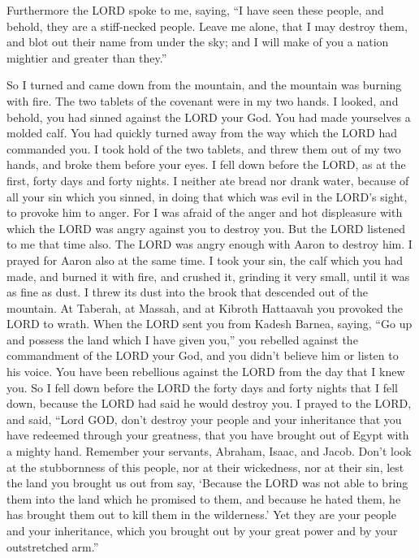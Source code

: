 \myverse{}Furthermore the LORD spoke to me, saying, “I have seen these
people, and behold, they are a stiff-necked people.
\myverse{}Leave me alone, that I may destroy them, and blot out their name from under
the sky; and I will make of you a nation mightier and greater than they.”


\myverse{}So I turned and came down from the mountain, and the mountain
was burning with fire. The two tablets of the covenant were in my two hands.
\myverse{}I looked, and behold, you had sinned against the LORD your God. You had made
yourselves a molded calf. You had quickly turned away from the way which the LORD had commanded you.
\myverse{}I took hold of the two tablets, and threw them out of my two hands, and broke
them before your eyes.
\myverse{}I fell down before the LORD, as at the first, forty days and forty nights.
I neither ate bread nor drank water, because of all your sin which you sinned, in doing that which was
evil in the LORD’s sight, to provoke him to anger.
\myverse{}For I was afraid of the anger and hot displeasure with which the LORD was
angry against you to destroy you. But the LORD listened to me that time also.
\myverse{}The LORD was angry enough with Aaron to destroy him. I prayed for Aaron also
at the same time.
\myverse{}I took your sin, the calf which you had made, and burned it with fire, and
crushed it, grinding it very small, until it was as fine as dust. I threw its dust into the brook that
descended out of the mountain.
\myverse{}At Taberah, at Massah, and at Kibroth Hattaavah you provoked the LORD to wrath.
\myverse{}When the LORD sent you from Kadesh Barnea, saying, “Go up and possess the
land which I have given you,” you rebelled against the commandment of the LORD your God, and you didn’t
believe him or listen to his voice.
\myverse{}You have been rebellious against the LORD from the day that I knew you.
\myverse{}So I fell down before the LORD the forty days and forty nights that I fell
down, because the LORD had said he would destroy you.
\myverse{}I prayed to the LORD, and said, “Lord GOD, don’t destroy your people and your
inheritance that you have redeemed through your greatness, that you have brought out of Egypt with a mighty
hand.
\myverse{}Remember your servants, Abraham, Isaac, and Jacob. Don’t look at the stubbornness
of this people, nor at their wickedness, nor at their sin,
\myverse{}lest the land you brought us out from say, ‘Because the LORD was not able
to bring them into the land which he promised to them, and because he hated them, he has brought them
out to kill them in the wilderness.’
\myverse{}Yet they are your people and your inheritance, which you brought out by your
great power and by your outstretched arm.”


